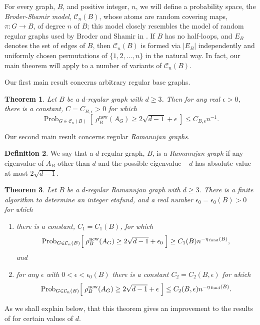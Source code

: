 \documentclass{memo-l}
\newcommand{\etafund}{{\eta_{\rm \,fund}}}
\theoremstyle{plain}
\newtheorem{theorem}{Theorem}[section]
\theoremstyle{definition}
\newtheorem{definition}[theorem]{Definition}
\numberwithin{section}{chapter}
\numberwithin{equation}{chapter}
\newcommand{\prob}[2]{{\Prob}_{#1}{\left[\; #2\; \right]}}
\DeclareMathOperator{\Prob}{Prob}
\newcommand{\from}{\colon}
\newcommand{\rhonew}{\rho^{\mathrm{new}}}
\theoremstyle{plain}
\theoremstyle{definition}
\newcommand\cC{\mathcal{C}}
\begin{document}
For every graph, $B$, and positive integer, $n$, we will define a
probability space, the {\em \gls{Broder-Shamir model}},
$\cC_n(B)$, whose atoms are
random covering maps, $\pi\from G\to B$, of degree
$n$ of $B$; this model closely resembles the model of 
random regular graphs used by
Broder and Shamir in \cite{broder}.  
If $B$ has no half-loops, and $E_B$ denotes the set of
edges of $B$, then $\cC_n(B)$ is formed via
$|E_B|$ independently and uniformly chosen permutations of
$\{1,2,\ldots,n\}$ in the natural way.
In fact, our main theorem will apply to a number of variants of
$\cC_n(B)$.

Our first main result concerns arbitrary regular base graphs.

\begin{theorem}\label{th:main_Alon}
Let $B$ be a $d$-regular graph with $d\ge 3$.
Then for any real 
$\epsilon>0$, there is a constant, $C=C_{B,\epsilon}>0$
for which
\begin{equation}\label{eq:main_Alon_bound}
\prob{G\in \cC_n(B)}{\rhonew_B(A_G) \ge 2\sqrt{d-1}
+\epsilon}
\le C_{B,\epsilon} n^{-1} .
\end{equation}
\end{theorem}

Our second main result concerns regular {\em \glspl{Ramanujan graph}}.

\begin{definition} We say that a $d$-regular graph, $B$, is a
{\em \gls{Ramanujan graph}} if any eigenvalue of $A_B$ other than $d$ and
the possible eigenvalue $-d$ has absolute value at most $2\sqrt{d-1}$.
\end{definition}

\begin{theorem}\label{th:main_Alon_Ramanujan}
Let $B$ be a $d$-regular Ramanujan graph with $d\ge 3$.
There is a finite algorithm to determine an integer 
\gls{etafund},
and a real number $\epsilon_0=\epsilon_0(B)>0$ for which
\begin{enumerate}
\item there is 
a constant, $C_1=C_1(B)$, for which
\begin{equation}\label{eq:eta_fund_lower}
\prob{G\in \cC_n(B)}{\rhonew_B(A_G) \ge 2\sqrt{d-1}
+\epsilon_0}
\ge C_1(B)n^{-\etafund(B)}, 
\end{equation}
and
\item for any $\epsilon$ with $0<\epsilon<\epsilon_0(B)$ there is a
constant $C_2=C_2(B,\epsilon)$ for which
\begin{equation}\label{eq:eta_fund_upper}
\prob{G\in \cC_n(B)}{\rhonew_B(A_G) \ge 2\sqrt{d-1}
+\epsilon}
\le C_2(B,\epsilon)n^{-\etafund(B)}.
\end{equation}
\end{enumerate}
\end{theorem}
As we shall explain below, that this theorem gives
an improvement to the results of \cite{friedman_alon} for certain
values of $d$.
\end{document}
